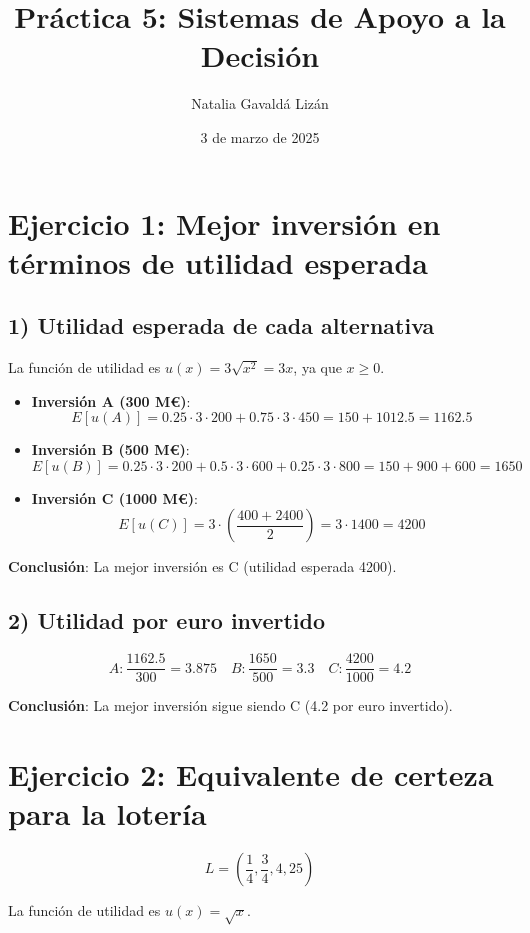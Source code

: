 \documentclass{article}
\title{Práctica 5: Sistemas de Apoyo a la Decisión}
\author{Natalia Gavaldá Lizán}
\date{3 de marzo de 2025}
\begin{document}
	
	\maketitle
	
	\section*{Ejercicio 1: Mejor inversión en términos de utilidad esperada}
	
	\subsection*{1) Utilidad esperada de cada alternativa}
	La función de utilidad es $u(x) = 3\sqrt{x^2} = 3x$, ya que $x \geq 0$.
	
	\begin{itemize}
		\item \textbf{Inversión A (300 M€)}:
		\[
		E[u(A)] = 0.25 \cdot 3 \cdot 200 + 0.75 \cdot 3 \cdot 450 = 150 + 1012.5 = 1162.5
		\]
		\item \textbf{Inversión B (500 M€)}:
		\[
		E[u(B)] = 0.25 \cdot 3 \cdot 200 + 0.5 \cdot 3 \cdot 600 + 0.25 \cdot 3 \cdot 800 = 150 + 900 + 600 = 1650
		\]
		\item \textbf{Inversión C (1000 M€)}:
		\[
		E[u(C)] = 3 \cdot \left(\frac{400 + 2400}{2}\right) = 3 \cdot 1400 = 4200
		\]
	\end{itemize}
	
	\textbf{Conclusión}: La mejor inversión es C (utilidad esperada 4200).
	
	\subsection*{2) Utilidad por euro invertido}
	
	\[
	A: \frac{1162.5}{300} = 3.875 \quad B: \frac{1650}{500} = 3.3 \quad C: \frac{4200}{1000} = 4.2
	\]
	
	\textbf{Conclusión}: La mejor inversión sigue siendo C (4.2 por euro invertido).
	
	\section*{Ejercicio 2: Equivalente de certeza para la lotería}
	
	\[
	L = \left(\frac{1}{4}, \frac{3}{4}, 4, 25\right)
	\]
	
	La función de utilidad es $u(x) = \sqrt{x}$.
	
\end{document}
